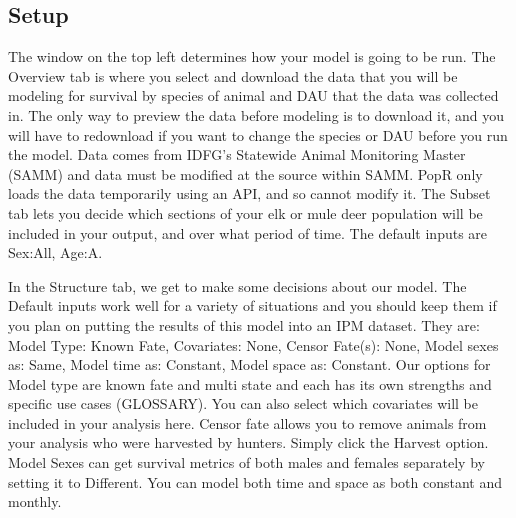 \documentclass[
]{book}
\begin{document}
\hypertarget{surv-setup}{%
\subsection{Setup}\label{surv-setup}}

The window on the top left determines how your model is going to be run. The Overview tab is where you select and download the data that you will be modeling for survival by species of animal and DAU that the data was collected in. The only way to preview the data before modeling is to download it, and you will have to redownload if you want to change the species or DAU before you run the model. Data comes from IDFG's Statewide Animal Monitoring Master (SAMM) and data must be modified at the source within SAMM. PopR only loads the data temporarily using an API, and so cannot modify it. The Subset tab lets you decide which sections of your elk or mule deer population will be included in your output, and over what period of time. The default inputs are Sex:All, Age:A.

In the Structure tab, we get to make some decisions about our model. The Default inputs work well for a variety of situations and you should keep them if you plan on putting the results of this model into an IPM dataset. They are: Model Type: Known Fate, Covariates: None, Censor Fate(s): None, Model sexes as: Same, Model time as: Constant, Model space as: Constant. Our options for Model type are known fate and multi state and each has its own strengths and specific use cases (GLOSSARY). You can also select which covariates will be included in your analysis here. Censor fate allows you to remove animals from your analysis who were harvested by hunters. Simply click the Harvest option. Model Sexes can get survival metrics of both males and females separately by setting it to Different. You can model both time and space as both constant and monthly.
\end{document}
